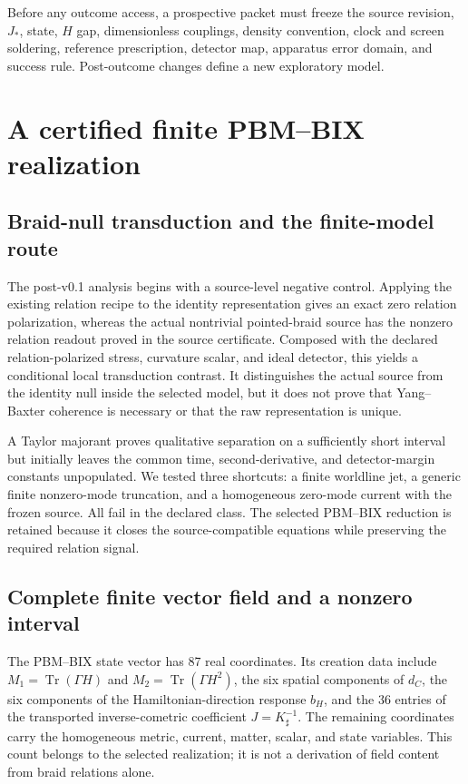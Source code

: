 \documentclass[11pt]{article}
\theoremstyle{definition}
\theoremstyle{remark}
\newcommand{\Tr}{\operatorname{Tr}}
\begin{document}
Before any outcome access, a prospective packet must freeze the source revision, $J_*$, state, $H$ gap, dimensionless couplings, density convention, clock and screen soldering, reference prescription, detector map, apparatus error domain, and success rule. Post-outcome changes define a new exploratory model.


\section{A certified finite PBM--BIX realization}

\subsection{Braid-null transduction and the finite-model route}

The post-v0.1 analysis begins with a source-level negative control. Applying the existing relation recipe to the identity representation gives an exact zero relation polarization, whereas the actual nontrivial pointed-braid source has the nonzero relation readout proved in the source certificate. Composed with the declared relation-polarized stress, curvature scalar, and ideal detector, this yields a conditional local transduction contrast. It distinguishes the actual source from the identity null inside the selected model, but it does not prove that Yang--Baxter coherence is necessary or that the raw representation is unique.

A Taylor majorant proves qualitative separation on a sufficiently short interval but initially leaves the common time, second-derivative, and detector-margin constants unpopulated. We tested three shortcuts: a finite worldline jet, a generic finite nonzero-mode truncation, and a homogeneous zero-mode current with the frozen source. All fail in the declared class. The selected PBM--BIX reduction is retained because it closes the source-compatible equations while preserving the required relation signal.

\subsection{Complete finite vector field and a nonzero interval}

The PBM--BIX state vector has 87 real coordinates. Its creation data include $M_1=\Tr(\Gamma H)$ and $M_2=\Tr(\Gamma H^2)$, the six spatial components of $d_C$, the six components of the Hamiltonian-direction response $b_H$, and the 36 entries of the transported inverse-cometric coefficient $J=K_\sharp^{-1}$. The remaining coordinates carry the homogeneous metric, current, matter, scalar, and state variables. This count belongs to the selected realization; it is not a derivation of field content from braid relations alone.
\end{document}
